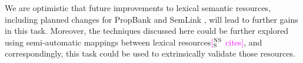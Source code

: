 \documentclass[11pt,a4paper]{article}
\newcommand{\ensuretext}[1]{#1}
\newcommand{\nssmarker}{\ensuretext{\textcolor{magenta}{\ensuremath{^{\textsc{NS}}_{\textsc{S}}}}}}
\newcommand{\arkcomment}[3]{\ensuretext{\textcolor{#3}{[#1 #2]}}}
\newcommand{\nss}[1]{\arkcomment{\nssmarker}{#1}{magenta}}
\newcommand{\finalversion}[1]{}
\begin{document}
We are optimistic that future improvements to lexical semantic resources, 
including planned changes for PropBank \citep{bonial-14} and SemLink \citep{bonial-13}, 
will lead to further gains in this task. 
Moreover, the techniques discussed here could be further explored 
using semi-automatic mappings between lexical resources\nss{cites}, 
and correspondingly, this task could be used to extrinsically validate those resources.

\finalversion{\section*{Acknowledgments}

FUNDING}

\smaller


\setlength{\bibsep}{1pt}
{\fontsize{10}{12.25}\selectfont
}
\end{document}
